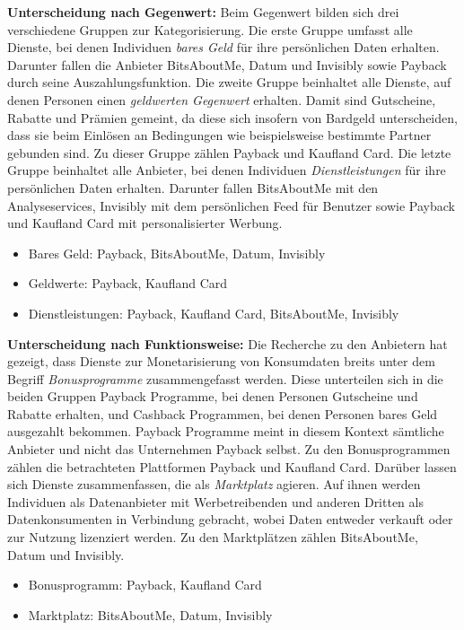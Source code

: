 \noindent \textbf{Unterscheidung nach Gegenwert:} Beim Gegenwert bilden sich drei verschiedene Gruppen zur Kategorisierung. Die erste Gruppe umfasst alle Dienste, bei denen Individuen \textit{bares Geld} für ihre persönlichen Daten erhalten. Darunter fallen die Anbieter BitsAboutMe, Datum und Invisibly sowie Payback durch seine Auszahlungsfunktion. Die zweite Gruppe beinhaltet alle Dienste, auf denen Personen einen \textit{geldwerten Gegenwert} erhalten. Damit sind Gutscheine, Rabatte und Prämien gemeint, da diese sich insofern von Bardgeld unterscheiden, dass sie beim Einlösen an Bedingungen wie beispielsweise bestimmte Partner gebunden sind. Zu dieser Gruppe zählen Payback und Kaufland Card. Die letzte Gruppe beinhaltet alle Anbieter, bei denen Individuen \textit{Dienstleistungen} für ihre persönlichen Daten erhalten. Darunter fallen BitsAboutMe mit den Analyseservices, Invisibly mit dem persönlichen Feed für Benutzer sowie Payback und Kaufland Card mit personalisierter Werbung.
\begin{itemize}
    \item Bares Geld: Payback, BitsAboutMe, Datum, Invisibly
    \item Geldwerte: Payback, Kaufland Card
    \item Dienstleistungen: Payback, Kaufland Card, BitsAboutMe, Invisibly
\end{itemize}

\noindent \textbf{Unterscheidung nach Funktionsweise:} Die Recherche zu den Anbietern hat gezeigt, dass Dienste zur Monetarisierung von Konsumdaten breits unter dem Begriff \textit{Bonusprogramme} zusammengefasst werden. Diese unterteilen sich in die beiden Gruppen Payback Programme, bei denen Personen Gutscheine und Rabatte erhalten, und Cashback Programmen, bei denen Personen bares Geld ausgezahlt bekommen. Payback Programme meint in diesem Kontext sämtliche Anbieter und nicht das Unternehmen Payback selbst. Zu den Bonusprogrammen zählen die betrachteten Plattformen Payback und Kaufland Card. Darüber lassen sich Dienste zusammenfassen, die als \textit{Marktplatz} agieren. Auf ihnen werden Individuen als Datenanbieter mit Werbetreibenden und anderen Dritten als Datenkonsumenten in Verbindung gebracht, wobei Daten entweder verkauft oder zur Nutzung lizenziert werden. Zu den Marktplätzen zählen BitsAboutMe, Datum und Invisibly.
\begin{itemize}
    \item Bonusprogramm: Payback, Kaufland Card
    \item Marktplatz: BitsAboutMe, Datum, Invisibly
\end{itemize}

